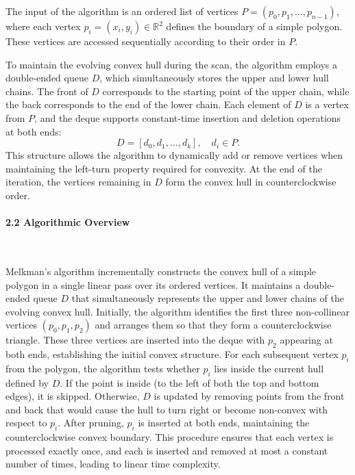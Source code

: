 \documentclass{article}
\begin{document}
The input of the algorithm is an ordered list of vertices $P = (p_0, p_1, \dots, p_{n-1})$, where each vertex $p_i = (x_i, y_i) \in \mathbb{R}^2$ defines the boundary of a simple polygon. 
These vertices are accessed sequentially according to their order in $P$.

To maintain the evolving convex hull during the scan, the algorithm employs a double-ended queue $D$, which simultaneously stores the upper and lower hull chains. 
The front of $D$ corresponds to the starting point of the upper chain, while the back corresponds to the end of the lower chain. 
Each element of $D$ is a vertex from $P$, and the deque supports constant-time insertion and deletion operations at both ends:
\[
D = [d_0, d_1, \dots, d_k], \quad d_i \in P.
\]
This structure allows the algorithm to dynamically add or remove vertices when maintaining the left-turn property required for convexity. 
At the end of the iteration, the vertices remaining in $D$ form the convex hull in counterclockwise order.

\paragraph{2.2 Algorithmic Overview}\

Melkman’s algorithm incrementally constructs the convex hull of a simple polygon in a single linear pass over its ordered vertices. 
It maintains a double-ended queue $D$ that simultaneously represents the upper and lower chains of the evolving convex hull. 
Initially, the algorithm identifies the first three non-collinear vertices $(p_0, p_1, p_2)$ and arranges them so that they form a counterclockwise triangle. 
These three vertices are inserted into the deque with $p_2$ appearing at both ends, establishing the initial convex structure.
For each subsequent vertex $p_i$ from the polygon, the algorithm tests whether $p_i$ lies inside the current hull defined by $D$. 
If the point is inside (to the left of both the top and bottom edges), it is skipped. 
Otherwise, $D$ is updated by removing points from the front and back that would cause the hull to turn right or become non-convex with respect to $p_i$. 
After pruning, $p_i$ is inserted at both ends, maintaining the counterclockwise convex boundary. 
This procedure ensures that each vertex is processed exactly once, and each is inserted and removed at most a constant number of times, leading to linear time complexity.
\end{document}

